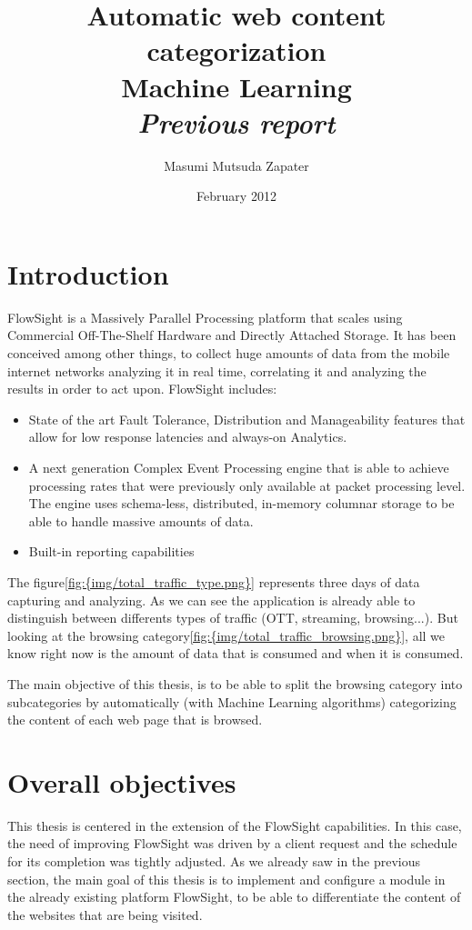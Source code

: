 \documentclass[12pt, a4paper , titlepage]{report}
\author{Masumi Mutsuda Zapater}
\title{Automatic web content categorization \\ Machine Learning \\ \large{\textit{Previous report}}}
\date{February 2012}
\begin{document}
\maketitle

\tableofcontents

\chapter{Introduction}
FlowSight is a Massively Parallel Processing platform that scales using Commercial Off-The-Shelf Hardware and Directly Attached Storage. It has been conceived among other things, to collect
huge amounts of data from the mobile internet networks analyzing it in real time, correlating it and analyzing the results in order to act upon. FlowSight includes:
\begin{itemize}
  \item{State of the art Fault Tolerance, Distribution and Manageability features that allow for low response latencies and always-on Analytics.}
  \item{A next generation Complex Event Processing engine that is able to achieve processing rates that were previously only available at packet processing level. The engine uses schema-less, 
        distributed, in-memory columnar storage to be able to handle massive amounts of data.}
  \item{Built-in reporting capabilities}
\end{itemize}
The figure\ref{fig:{img/total_traffic_type.png}} represents three days of data capturing and analyzing. As we can see the application is already able to distinguish between differents types of traffic (OTT, streaming, browsing...).
But looking at the browsing category\ref{fig:{img/total_traffic_browsing.png}}, all we know right now is the amount of data that is consumed and when it is consumed.



The main objective of this thesis, is to be able to split the browsing category into subcategories by automatically (with Machine Learning algorithms) categorizing the content of each web page that is browsed. 


\chapter{Overall objectives}
This thesis is centered in the extension of the FlowSight capabilities. In this case, the need of improving FlowSight was driven by a client request and the schedule for its completion was tightly
adjusted. As we already saw in the previous section, the main goal of this thesis is to implement and configure a module in the already existing platform FlowSight, to be able to differentiate
the content of the websites that are being visited. 
\end{document}
